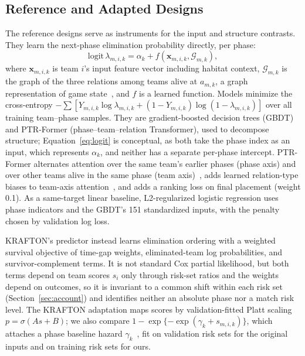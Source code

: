 \documentclass[sigconf,anonymous,nonacm]{acmart}
\begin{document}
\subsection{Reference and Adapted Designs}
\label{sec:method:rq2}
The reference designs serve as instruments for the input and structure contrasts. They learn the next-phase elimination probability directly, per phase:
\begin{equation}
\mathrm{logit}\,\lambda_{m,i,k}=\alpha_k+f(\mathbf{x}_{m,i,k},\mathcal{G}_{m,k}),
\label{eq:logit}
\end{equation}
where $\mathbf{x}_{m,i,k}$ is team $i$'s input feature vector including habitat context, $\mathcal{G}_{m,k}$ is the graph of the three relations among teams alive at $a_{m,k}$, a graph representation of game state~\cite{Xenopoulos21}, and $f$ is a learned function.
Models minimize the cross-entropy $-\sum[Y_{m,i,k}\log\lambda_{m,i,k}+(1-Y_{m,i,k})\log(1-\lambda_{m,i,k})]$ over all training team--phase samples.
They are gradient-boosted decision trees (GBDT)~\cite{Friedman01} and PTR-Former (phase--team--relation Transformer), used to decompose structure; Equation~\eqref{eq:logit} is conceptual, as both take the phase index as an input, which represents $\alpha_k$, and neither has a separate per-phase intercept.
PTR-Former alternates attention over the same team's earlier phases (phase axis) and over other teams alive in the same phase (team axis)~\cite{Vaswani17,Ngiam22}, adds learned relation-type biases to team-axis attention~\cite{Ying21}, and adds a ranking loss on final placement (weight 0.1). As a same-target linear baseline, L2-regularized logistic regression uses phase indicators and the GBDT's 151 standardized inputs, with the penalty chosen by validation log loss.

KRAFTON's predictor instead learns elimination ordering with a weighted survival objective of time-gap weights, eliminated-team log probabilities, and survivor-complement terms. It is not standard Cox partial likelihood, but both terms depend on team scores $s_i$ only through risk-set ratios and the weights depend on outcomes, so it is invariant to a common shift within each risk set (Section~\ref{sec:account}) and identifies neither an absolute phase nor a match risk level. The KRAFTON adaptation maps scores by validation-fitted Platt scaling $p=\sigma(A s+B)$; we also compare $1-\exp\{-\exp(\gamma_k+s_{m,i,k})\}$, which attaches a phase baseline hazard $\gamma_k$~\cite{PrenticeGloeckler78}, fit on validation risk sets for the original inputs and on training risk sets for ours.
\end{document}
